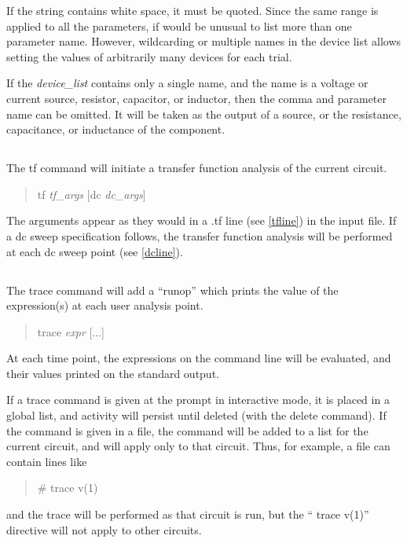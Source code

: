 If the string contains white space, it must be quoted.  Since the same
range is applied to all the parameters, if would be unusual to list
more than one parameter name.  However, wildcarding or multiple names
in the device list allows setting the values of arbitrarily many
devices for each trial.

If the {\it device\_list} contains only a single name, and the name is
a voltage or current source, resistor, capacitor, or inductor, then
the comma and parameter name can be omitted.  It will be taken as the
output of a source, or the resistance, capacitance, or inductance of
the component.

\subsection{}


The {\cb tf} command will initiate a transfer function analysis of the
current circuit.
\begin{quote}\vt
tf {\it tf\_args} [dc {\it dc\_args\/}]
\end{quote}
The arguments appear as they would in a {\vt .tf} line (see
\ref{tfline}) in the input file.  If a dc sweep specification follows,
the transfer function analysis will be performed at each dc sweep
point (see \ref{dcline}).

\subsection{}


The {\cb trace} command will add a ``runop'' which prints the value of
the expression(s) at each user analysis point.
\begin{quote}\vt
trace {\it expr\/} [...]
\end{quote}
At each time point, the expressions on the command line will be
evaluated, and their values printed on the standard output.

If a trace command is given at the prompt in interactive mode, it is
placed in a global list, and activity will persist until deleted (with
the {\cb delete} command).  If the command is given in a file, the
command will be added to a list for the current circuit, and will
apply only to that circuit.  Thus, for example, a {\WRspice} file can
contain lines like
\begin{quote}
{\vt *\# trace v(1)}
\end{quote}
and the trace will be performed as that circuit is run, but the ``{\vt
trace v(1)}'' directive will not apply to other circuits.

